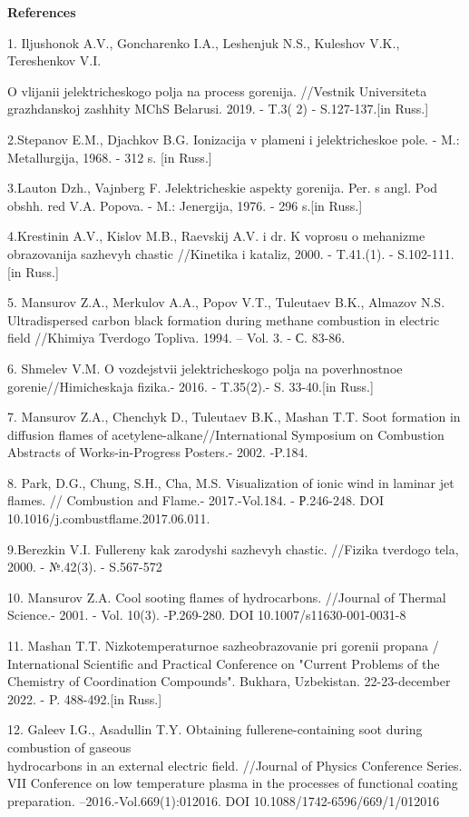 \begin{center}
{\bfseries References}
\end{center}

\begin{noparindent}
1. Il\textquotesingle jushonok A.V., Goncharenko I.A., Leshenjuk N.S.,
Kuleshov V.K., Tereshenkov V.I.

O vlijanii jelektricheskogo polja na process gorenija. //Vestnik
Universiteta grazhdanskoj zashhity MChS Belarusi. 2019. - T.3( 2) -
S.127-137.{[}in Russ.{]}

2.Stepanov E.M., D\textquotesingle jachkov B.G. Ionizacija v plameni i
jelektricheskoe pole. - M.: Metallurgija, 1968. - 312 s. {[}in Russ.{]}

3.Lauton Dzh., Vajnberg F. Jelektricheskie aspekty gorenija. Per. s
angl. Pod obshh. red V.A. Popova. - M.: Jenergija, 1976. - 296 s.{[}in
Russ.{]}

4.Krestinin A.V., Kislov M.B., Raevskij A.V. i dr. K voprosu o mehanizme
obrazovanija sazhevyh chastic //Kinetika i kataliz, 2000. - T.41.(1). -
S.102-111. {[}in Russ.{]}

5. Mansurov Z.A., Merkulov A.A., Popov V.T., Tuleutaev B.K., Almazov
N.S. Ultradispersed carbon black formation during methane combustion in
electric field //Khimiya Tverdogo Topliva. 1994. -- Vol. 3. - С. 83-86.

6. Shmelev V.M. O vozdejstvii jelektricheskogo polja na poverhnostnoe
gorenie//Himicheskaja fizika.- 2016. - T.35(2).- S. 33-40.{[}in Russ.{]}

7. Mansurov Z.A., Chenchyk D., Tuleutaev B.K., Mashan T.T. Soot
formation in diffusion flames of acetylene-alkane//International
Symposium on Combustion Abstracts of Works-in-Progress Posters.- 2002.
-P.184.

8. Park, D.G., Chung, S.H., Cha, M.S. Visualization of ionic wind in
laminar jet flames. // Combustion and Flame.- 2017.-Vol.184. -
Р.246-248. DOI 10.1016/j.combustflame.2017.06.011.

9.Berezkin V.I. Fullereny kak zarodyshi sazhevyh chastic. //Fizika
tverdogo tela, 2000. - №.42(3). - S.567-572

10. Mansurov Z.A. Cool sooting flames of hydrocarbons. //Journal of
Thermal Science.- 2001. - Vol. 10(3). -P.269-280. DOI
10.1007/s11630-001-0031-8

11. Mashan T.T. Nizkotemperaturnoe sazheobrazovanie pri gorenii propana
/ International Scientific and Practical Conference on "Current Problems
of the Chemistry of Coordination Compounds". Bukhara, Uzbekistan.
22-23-december 2022. - P. 488-492.{[}in Russ.{]}

12. Galeev I.G., Asadullin T.Y. Obtaining fullerene-containing soot
during combustion of gaseous \\hydrocarbons in an external electric field.
//Journal of Physics Conference Series. VII Conference on low
temperature plasma in the processes of functional coating preparation.
--2016.-Vol.669(1):012016. DOI 10.1088/1742-6596/669/1/012016
\end{noparindent}

